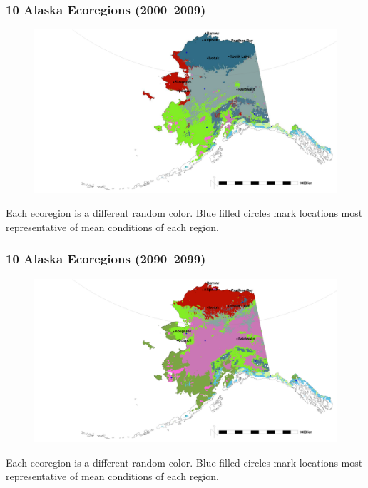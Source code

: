 \begin{frame}
 \frametitle{10 Alaska Ecoregions (2000--2009)}
 \begin{figure}
  \begin{center}
   \vskip-0.20in
   \includegraphics[width=\textwidth]{ngee_figures/alaska_dem_Feb2012_10_2000-2009_barscale}
  \end{center}
  \label{fig:alaska_2000_2009_10}
 \end{figure}
 \vskip-0.10in
 \vbox{\scriptsize\hfill\citep{Hoffman_LandscapeEcol_20131001}}
\smallskip
Each ecoregion is a different random color. Blue filled circles mark
locations most representative of mean conditions of each region.
\end{frame}

\begin{frame}
 \frametitle{10 Alaska Ecoregions (2090--2099)}
 \vskip-0.20in
 \begin{figure}
  \begin{center}
   \includegraphics[width=\textwidth]{ngee_figures/alaska_dem_Feb2012_10_2090-2099_barscale}
  \end{center}
  \label{fig:alaska_2090_2099_10}
 \end{figure}
 \vskip-0.10in
 \vbox{\scriptsize\hfill\citep{Hoffman_LandscapeEcol_20131001}}
\smallskip
Each ecoregion is a different random color. Blue filled circles mark
locations most representative of mean conditions of each region.
\end{frame}

